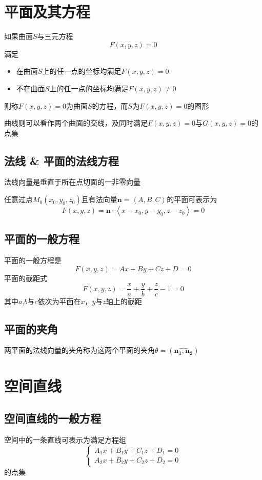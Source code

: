 \documentclass[UTF8]{ctexart}
\newcommand{\ve}[1]{{\bm{#1}}}
\newcommand{\veN}[3]{{\left\langle#1,#2,#3\right\rangle}}
\newcommand{\ang}[2]{{(\widehat{\ve{#1},\ve{#2}})}}
\begin{document}
\bigskip
\bigskip

\section*{平面及其方程}

如果曲面$S$与三元方程
\[F(x,y,z)=0\]
满足
\begin{itemize}
  \item 在曲面$S$上的任一点的坐标均满足$F(x,y,z)=0$
  \item 不在曲面$S$上的任一点的坐标均满足$F(x,y,z)\ne0$
\end{itemize}
则称$F(x,y,z)=0$为曲面$S$的方程，而$S$为$F(x,y,z)=0$的图形

曲线则可以看作两个曲面的交线，及同时满足$F(x,y,z)=0$与$G(x,y,z)=0$的点集

\subsection*{法线 \& 平面的法线方程}
法线向量是垂直于所在点切面的一非零向量

任意过点$M_0(x_0,y_0,z_0)$且有法向量$\ve{n}=\veN{A}{B}{C}$的平面可表示为
\[F(x,y,z)=\ve{n}\cdot\veN{x-x_0}{y-y_0}{z-z_0}=0\]

\subsection*{平面的一般方程}
平面的一般方程是
\[F(x,y,z)=Ax+By+Cz+D=0\]
平面的截距式
\[F(x,y,z)=\frac{x}{a}+\frac{y}{b}+\frac{z}{c}-1=0\]
其中$a$,$b$与$c$依次为平面在$x$，$y$与$z$轴上的截距

\subsection*{平面的夹角}
两平面的法线向量的夹角称为这两个平面的夹角$\theta=\ang{n_1}{n_2}$
\bigskip
\bigskip
\section*{空间直线}

\bigskip

\subsection*{空间直线的一般方程}
空间中的一条直线可表示为满足方程组
\[\begin{cases}
A_1x+B_1y+C_1z+D_1=0\\
A_2x+B_2y+C_2z+D_2=0
\end{cases}\]
的点集
\end{document}

